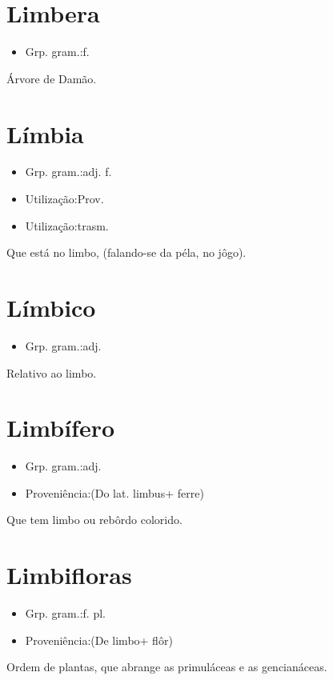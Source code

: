 \section{Limbera}
\begin{itemize}
\item {Grp. gram.:f.}
\end{itemize}
Árvore de Damão.
\section{Límbia}
\begin{itemize}
\item {Grp. gram.:adj. f.}
\end{itemize}
\begin{itemize}
\item {Utilização:Prov.}
\end{itemize}
\begin{itemize}
\item {Utilização:trasm.}
\end{itemize}
Que está no limbo, (falando-se da péla, no jôgo).
\section{Límbico}
\begin{itemize}
\item {Grp. gram.:adj.}
\end{itemize}
Relativo ao limbo.
\section{Limbífero}
\begin{itemize}
\item {Grp. gram.:adj.}
\end{itemize}
\begin{itemize}
\item {Proveniência:(Do lat. \textunderscore limbus\textunderscore  + \textunderscore ferre\textunderscore )}
\end{itemize}
Que tem limbo ou rebôrdo colorido.
\section{Limbifloras}
\begin{itemize}
\item {Grp. gram.:f. pl.}
\end{itemize}
\begin{itemize}
\item {Proveniência:(De \textunderscore limbo\textunderscore  + \textunderscore flôr\textunderscore )}
\end{itemize}
Ordem de plantas, que abrange as primuláceas e as gencianáceas.
